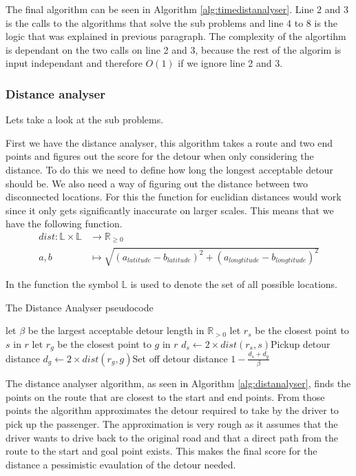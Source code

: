 The final algorithm can be seen in Algorithm \ref{alg:timedistanalyser}.
Line 2 and 3 is the calls to the algorithms that solve the sub problems and line 4 to 8 is the logic that was explained in previous paragraph.
The complexity of the algortihm is dependant on the two calls on line 2 and 3, because the rest of the algorim is input independant and therefore $O(1)$ if we ignore line 2 and 3.

\subsubsection{Distance analyser}

Lets take a look at the sub problems.

First we have the distance analyser, this algorithm takes a route and two end points and figures out the score for the detour when only considering the distance.
To do this we need to define how long the longest acceptable detour should be.
We also need a way of figuring out the distance between two disconnected locations. 
For this the function for euclidian distances would work since it only gets significantly inaccurate on larger scales.
This means that we have the following function.
\begin{align*}
	dist : \mathbb{L}\times\mathbb{L} &\rightarrow \mathbb{R}_{\geq 0}\\
	a, b &\mapsto \sqrt{(a_{latitude} - b_{latitude})^2 + (a_{longtitude} - b_{longtitude})^2}
\end{align*}

In the function the symbol $\mathbb{L}$ is used to denote the set of all possible locations.


\begin{algorithm}
	\caption{The Distance Analyser pseudocode}
	\label{alg:distanalyser}
	\begin{algorithmic}[1]
		\Require 
		\Statex let $\beta$ be the largest acceptable detour length in $\mathbb{R}_{>0}$ 
		\Statex 
			\State let $r_s$ be the closest point to $s$ in $r$
			\State let $r_g$ be the closest point to $g$ in $r$
			\State $d_s\gets 2\times dist(r_s, s)$\Comment Pickup detour distance
			\State $d_g\gets 2\times dist(r_g, g)$\Comment Set off detour distance
			\State\Return $1-\frac{d_s + d_g}{\beta}$
		\EndFunction
	\end{algorithmic}
\end{algorithm}

The distance analyser algorithm, as seen in Algorithm \ref{alg:distanalyser}, finds the points on the route that are closest to the start and end points.
From those points the algorithm approximates the detour required to take by the driver to pick up the passenger.
The approximation is very rough as it assumes that the driver wants to drive back to the original road and that a direct path from the route to the start and goal point exists.
This makes the final score for the distance a pessimistic evaulation of the detour needed.

